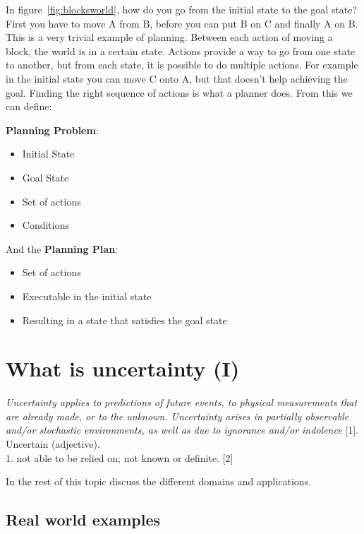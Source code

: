 \documentclass[runningheads,a4paper]{llncs}
\begin{document}
In figure~\ref{fig:blocksworld}, how do you go from the initial state to the
goal state? First you have to move A from B, before you can put B on C and
finally A on B. This is a very trivial example of planning. Between each
action of moving a block, the world is in a certain state. Actions provide
a way to go from one state to another, but from each state, it is possible
to do multiple actions. For example in the initial state you can move C onto
A, but that doesn't help achieving the goal. Finding the right sequence of
actions is what a planner does. From this we can define:

\noindent \textbf{Planning Problem}:

\begin{itemize}
	\item Initial State
	\item Goal State
	\item Set of actions
	\item Conditions
\end{itemize}

\noindent And the \textbf{Planning Plan}:

\begin{itemize}
	\item Set of actions
	\item Executable in the initial state
	\item Resulting in a state that satisfies the goal state
\end{itemize}

\section{What is uncertainty (I)}

\emph{Uncertainty applies to predictions of future events, to physical measurements that are already made, or to the unknown. Uncertainty arises in partially observable and/or stochastic environments, as well as due to ignorance and/or indolence} [1]. \\

Uncertain (adjective). \\
1. not able to be relied on; not known or definite. [2]

In the rest of this topic discuss the different domains and applications.

\subsection{Real world examples}
\end{document}
